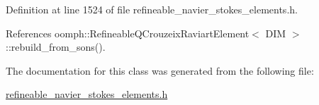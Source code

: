 Definition at line 1524 of file refineable\+\_\+navier\+\_\+stokes\+\_\+elements.\+h.



References oomph\+::\+Refineable\+Q\+Crouzeix\+Raviart\+Element$<$ D\+I\+M $>$\+::rebuild\+\_\+from\+\_\+sons().



The documentation for this class was generated from the following file\+:\begin{DoxyCompactItemize}
\item 
\hyperlink{refineable__navier__stokes__elements_8h}{refineable\+\_\+navier\+\_\+stokes\+\_\+elements.\+h}\end{DoxyCompactItemize}

